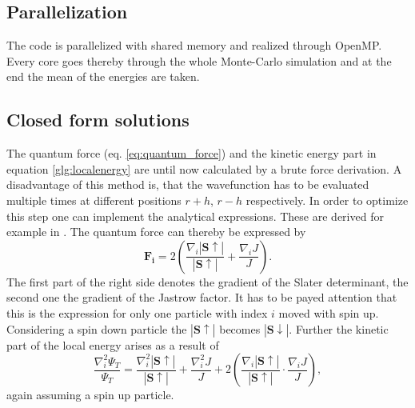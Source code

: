 \subsection{Parallelization}
The code is parallelized with shared memory and realized through OpenMP. Every core goes thereby through the whole Monte-Carlo simulation and at the end the mean of the energies are taken. 

\subsection{Closed form solutions}\label{sec:closed_form}
The quantum force (eq. \ref{eq:quantum_force}) and the kinetic energy part in equation \ref{glg:localenergy} are until now calculated by a brute force derivation. A disadvantage of this method is, that the wavefunction has to be evaluated multiple times at different positions $r+h$, $r-h$ respectively. In order to optimize this step one can implement the analytical expressions. These are derived for example in \citet{hogberget2013}. The quantum force can thereby be expressed by
\begin{equation}
\mathbf{F_i} = 2 \left( \frac{\nabla_i |\mathbf{S\uparrow}|}{|\mathbf{S\uparrow}|} + \frac{\nabla_i J}{J} \right).
\end{equation}
The first part of the right side denotes the gradient of the Slater determinant, the second one the gradient of the Jastrow factor. It has to be payed attention that this is the expression for only one particle with index $i$ moved with spin up. Considering a spin down particle the $|\mathbf{S\uparrow}|$ becomes $|\mathbf{S\downarrow}|$. Further the kinetic part of the local energy arises as a result of
\begin{equation}
\frac{\nabla_i^2 \Psi_T}{\Psi_T} = \frac{\nabla_i^2 |\mathbf{S\uparrow}|}{|\mathbf{S\uparrow}|} + \frac{\nabla_i^2 J}{J} + 2\left( \frac{\nabla_i |\mathbf{S\uparrow}|}{|\mathbf{S\uparrow}|} \cdot \frac{\nabla_i J}{J} \right),
\end{equation}
again assuming a spin up particle.

